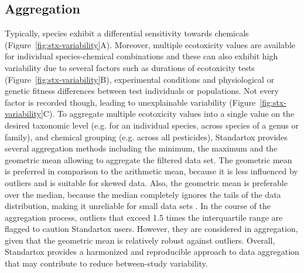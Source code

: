 \documentclass[journal,datadescriptor,accept,moreauthors,pdftex]{Definitions/mdpi}
\begin{document}
\subsection{Aggregation}
Typically, species exhibit a differential sensitivity towards chemicals (Figure~\ref{fig:stx-variability}A). Moreover, multiple ecotoxicity values are available for individual species-chemical combinations and these can also exhibit high variability due to several factors such as durations of ecotoxicity tests (Figure~\ref{fig:stx-variability}B), experimental conditions and physiological or genetic fitness differences between test individuals or populations. Not every factor is recorded though, leading to unexplainable variability (Figure~\ref{fig:stx-variability}C). To aggregate multiple ecotoxicity values into a single value on the desired taxonomic level (e.g. for an individual species, across species of a genus or family), and chemical grouping (e.g. across all pesticides), Standartox provides several aggregation methods including the minimum, the maximum and the geometric mean allowing to aggregate the filtered data set. The geometric mean is preferred in comparison to the arithmetic mean, because it is less influenced by outliers and is suitable for skewed data. Also, the geometric mean is preferable over the median, because the median completely ignores the tails of the data distribution, making it unreliable for small data sets \citep{leith_comparison_2010}. In the course of the aggregation process, outliers that exceed 1.5 times the interquartile range are flagged to caution Standartox users. However, they are considered in aggregation, given that the geometric mean is relatively robust against outliers. Overall, Standartox provides a harmonized and reproducible approach to data aggregation that may contribute to reduce between-study variability.
\end{document}
